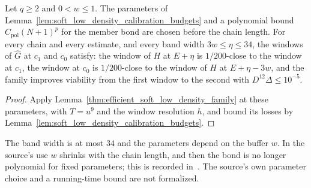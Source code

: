 \begin{lemma}
    \label{lem:calibrated_efficient_soft_low_density_family}
    \leanok

    Let $q\geq2$ and $0<w\leq1$. The parameters of
    Lemma~\ref{lem:soft_low_density_calibration_budgets} and a polynomial bound
    $C_{\mathrm{pol}}(N+1)^{p}$ for the member bond are chosen before the chain
    length. For every chain and every estimate, and every band width
    $3w\leq\eta\leq34$, the windows of $\widehat G$ at $c_1$ and $c_0$ satisfy:
    the window of $H$ at $E+\eta$ is $1/200$-close to the window at $c_1$, the
    window at $c_0$ is $1/200$-close to the window of $H$ at $E+\eta-3w$, and the
    family improves viability from the first window to the second with
    $D^{12}\Delta\leq10^{-5}$.
\end{lemma}
\begin{proof}\leanok
    Apply Lemma~\ref{thm:efficient_soft_low_density_family} at these parameters,
    with $T=u^9$ and the window resolution $h$, and bound its losses by
    Lemma~\ref{lem:soft_low_density_calibration_budgets}.
\end{proof}

The band width is at most $34$ and the parameters depend on the buffer $w$. In
the source's use $w$ shrinks with the chain length, and then the bond is no
longer polynomial for fixed parameters; this is recorded
in~\cite{gap:alvv16_soft_regional_residuals}. The source's own parameter choice
and a running-time bound are not formalized.

